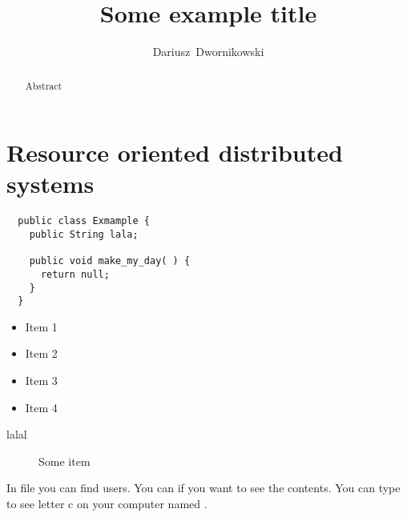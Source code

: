 \documentclass[english]{ddrep}
\begin{document}
\title{Some example title}
\author{Dariusz~Dwornikowski}

\maketitlepage

\begin{abstract}
  Abstract
\end{abstract}

\section{Resource oriented distributed systems}\label{sec:ROA}

\lstset{language=Java}
\begin{lstlisting}
  public class Exmample {
    public String lala;

    public void make_my_day( ) {
      return null;
    }
  }

\end{lstlisting}

\begin{itemize}
  \item Item 1
  \item Item 2
  \item Item 3
  \item Item 4
\end{itemize}

\begin{description}
  \item[lalal] Some item
\end{description}

In file  you can find users. You can  if you want to see the
contents. You can type  to see letter c on your computer named  .
\end{document}

